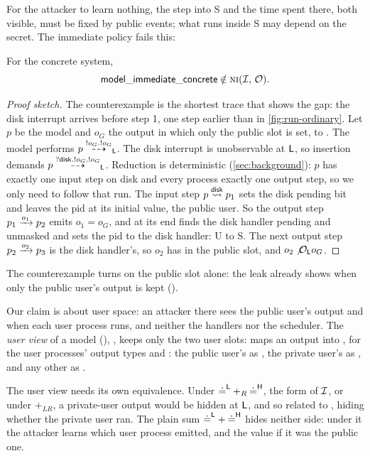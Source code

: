 For the attacker to learn nothing, the step into S and the time spent there, both
visible, must be fixed by public events; what runs inside S may depend on the secret.
The immediate policy fails this:

\begin{theorem}\label{thm:leak}
For the concrete system,
\[
\mathsf{model\_immediate\_concrete} \notin
  \text{\normalfont\scshape ni}(\mathcal{I},\, \mathcal{O}).
\]
\end{theorem}

\begin{proof}[Proof sketch]
The counterexample is the shortest trace that shows the gap: the disk interrupt
arrives before step 1, one step earlier than in \cref{fig:run-ordinary}. Let $p$ be the model and $o_G$ the output in which only the public slot is set, to
. The model performs $p \overset{!o_G.!o_G}{\dashrightarrow}_{\mathsf{L}}$. The disk interrupt is
unobservable at $\mathsf{L}$, so insertion demands $p \overset{?\mathsf{disk}.!o_G.!o_G}{\dashrightarrow}_{\mathsf{L}}$.
Reduction is deterministic (\cref{sec:background}): $p$ has exactly one input step on
\textsf{disk} and every process exactly one output step, so we only need to follow
that run. The input step $p \overset{\mathsf{disk}}{\rightsquigarrow} p_1$ sets the disk pending bit and
leaves the pid at its initial value, the public user. So the output step
$p_1 \xrightarrow{o_1} p_2$ emits $o_1 = o_G$, and at its end  finds the
disk handler pending and unmasked and sets the pid to the disk handler: U to S. The
next output step $p_2 \xrightarrow{o_2} p_3$ is the disk handler's, so $o_2$ has
 in the public slot, and $o_2 \not\mathcal{O}_{\mathsf{L}} o_G$.
\end{proof}

The counterexample turns on the public slot alone: the leak already shows when only the
public user's output is kept ().

Our claim is about user space: an attacker there sees the public user's output and
when each user process runs, and neither the handlers nor the scheduler. The
\emph{user view} of a model  (),
, keeps only the two user slots:  maps an
output into , for the user processes' output
types  and : the public user's as
, the private user's as , and any other as
.

The user view needs its own equivalence. Under ${\doteq^{\mathsf{L}}} +_R {\doteq^{\mathsf{H}}}$, the form of
$\mathcal{I}$, or under $+_{LR}$, a
private-user output would be hidden at $\mathsf{L}$, and so related to , hiding
whether the private user ran. The plain sum ${\doteq^{\mathsf{L}}} + {\doteq^{\mathsf{H}}}$ hides neither side:
under it the attacker learns which user process emitted, and the value if it was the
public one.

